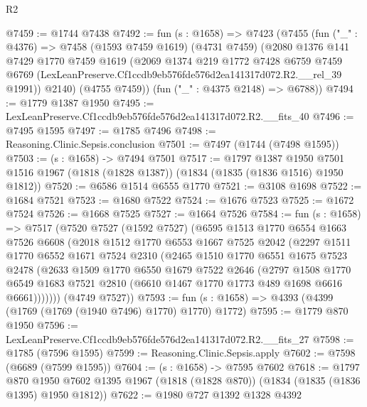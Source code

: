 \begin{lexlean}{R2}
\begin{coremodule}
@7459 := @1744 @7438
@7492 := fun (s : @1658) =>
  @7423
    (@7455
      (fun ("_" : @4376) =>
      @7458
        (@1593 @7459 @1619)
        (@4731 @7459)
        (@2080
          @1376
          @141
          @7429
          @1770
          @7459
          @1619
          (@2069
            @1374
            @219
            @1772
            @7428
            @6759
            @7459
            @6769
            (LexLeanPreserve.Cf1ccdb9eb576fde576d2ea141317d072.R2.__rel_39 @1991))
          @2140)
        (@4755 @7459))
      (fun ("_" : @4375 @2148) => @6788))
@7494 := @1779 @1387 @1950
@7495 := LexLeanPreserve.Cf1ccdb9eb576fde576d2ea141317d072.R2.__fits_40
@7496 := @7495 @1595
@7497 := @1785 @7496
@7498 := Reasoning.Clinic.Sepsis.conclusion
@7501 := @7497 (@1744 (@7498 @1595))
@7503 := (s : @1658) -> @7494 @7501
@7517 := @1797
    @1387
    @1950
    @7501
    @1516
    @1967
    (@1818 (@1828 @1387))
    (@1834 (@1835 (@1836 @1516) @1950 @1812))
@7520 := @6586 @1514 @6555 @1770
@7521 := @3108 @1698
@7522 := @1684 @7521
@7523 := @1680 @7522
@7524 := @1676 @7523
@7525 := @1672 @7524
@7526 := @1668 @7525
@7527 := @1664 @7526
@7584 := fun (s : @1658) =>
  @7517
    (@7520
      @7527
      (@1592 @7527)
      (@6595
        @1513
        @1770
        @6554
        @1663
        @7526
        @6608
        (@2018
          @1512
          @1770
          @6553
          @1667
          @7525
          @2042
          (@2297
            @1511
            @1770
            @6552
            @1671
            @7524
            @2310
            (@2465
              @1510
              @1770
              @6551
              @1675
              @7523
              @2478
              (@2633
                @1509
                @1770
                @6550
                @1679
                @7522
                @2646
                (@2797
                  @1508
                  @1770
                  @6549
                  @1683
                  @7521
                  @2810
                  (@6610 @1467 @1770 @1773 @489 @1698 @6616 @6661)))))))
      (@4749 @7527))
@7593 := fun (s : @1658) => @4393 (@4399 (@1769 (@1769 (@1940 @7496) @1770) @1770) @1772)
@7595 := @1779 @870 @1950
@7596 := LexLeanPreserve.Cf1ccdb9eb576fde576d2ea141317d072.R2.__fits_27
@7598 := @1785 (@7596 @1595)
@7599 := Reasoning.Clinic.Sepsis.apply
@7602 := @7598 (@6689 (@7599 @1595))
@7604 := (s : @1658) -> @7595 @7602
@7618 := @1797
    @870
    @1950
    @7602
    @1395
    @1967
    (@1818 (@1828 @870))
    (@1834 (@1835 (@1836 @1395) @1950 @1812))
@7622 := @1980 @727 @1392 @1328 @4392

\end{coremodule}
\end{lexlean}
